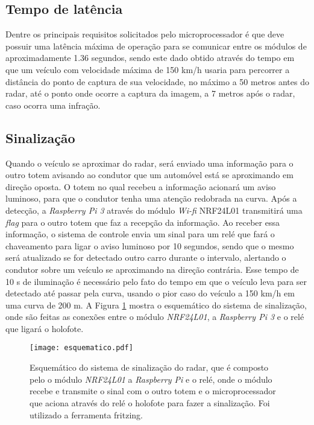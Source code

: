 \subsection{Tempo de latência}\label{tempo_latencia}

Dentre os principais requisitos solicitados pelo microprocessador é que deve possuir uma latência máxima de operação para se comunicar entre os módulos de aproximadamente 1.36 segundos, sendo este dado obtido através do tempo em que um veículo com velocidade máxima de 150 km/h usaria para percorrer a distância do ponto de captura de sua velocidade, no máximo a 50 metros antes do radar, até o ponto onde ocorre a captura da imagem, a 7 metros após o radar, caso ocorra uma infração. 
      
\subsection{Sinalização}
    
Quando o veículo se aproximar do radar, será enviado uma informação para o outro totem avisando ao condutor que um automóvel está se aproximando em direção oposta. O totem no qual recebeu a informação acionará um aviso luminoso, para que o condutor tenha uma atenção redobrada na curva. Após a detecção, a \emph{Raspberry Pi 3} através do módulo \emph{Wi-fi} NRF24L01 transmitirá uma \emph{flag} para o outro totem que faz a recepção da informação. Ao receber essa informação, o sistema de controle envia um sinal para um relé que fará o chaveamento para ligar o aviso luminoso por 10 segundos, sendo que o mesmo será atualizado se for detectado outro carro durante o intervalo, alertando o condutor sobre um veículo se aproximando na direção contrária. Esse tempo de 10 s de iluminação é necessário pelo fato do tempo em que o veículo leva para ser detectado até passar pela curva, usando o pior caso do veículo a 150 km/h em uma curva de 200 m.
A Figura \ref{esquematico} mostra o esquemático do sistema de sinalização, onde são feitas as conexões entre o módulo \emph{NRF24L01}, a \emph{Raspberry Pi 3} e o relé que ligará o holofote.

\begin{figure}[H]
    \centering
    \texttt{[image: esquematico.pdf]}
    \caption{Esquemático do sistema de sinalização do radar, que é composto pelo o módulo \emph{NRF24L01} a \emph{Raspberry Pi} e o relé, onde o módulo recebe e transmite o sinal com o outro totem e o microprocessador que aciona através do relé o holofote para fazer a sinalização. Foi utilizado a ferramenta fritzing.}
    \label{esquematico}
\end{figure}
   
